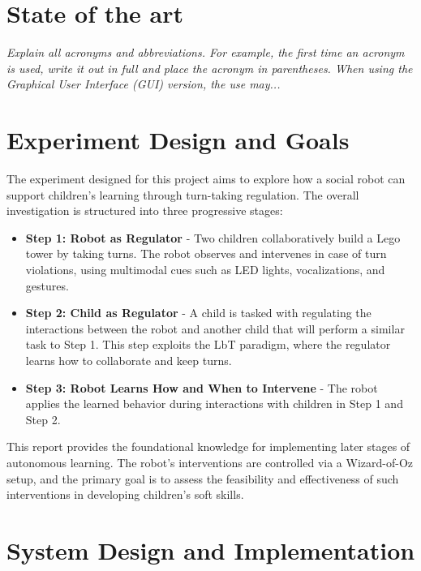 \documentclass[a4paper]{usiinfbachelorproject}
\begin{document}
\section{\textbf{State of the art}}\label{sec:background}
\textit{
    Explain all acronyms and abbreviations. For example, the first time an acronym is used, write it out in full and place the acronym in
    parentheses. When using the Graphical User Interface (GUI) version, the use may...
}


\section{\textbf{Experiment Design and Goals}}\label{sec:design}

The experiment designed for this project aims to explore how a social robot can support children's learning through turn-taking regulation. The overall investigation is structured into three progressive stages:

\begin{itemize}
    \item \textbf{Step 1: Robot as Regulator} - Two children collaboratively build a Lego tower by taking turns. The robot observes and intervenes in case of turn violations, using multimodal cues such as LED lights, vocalizations, and gestures.
    \item \textbf{Step 2: Child as Regulator} - A child is tasked with regulating the interactions between the robot and another child that will perform a similar task to Step 1. This step exploits the LbT paradigm, where the regulator learns how to collaborate and keep turns.
    \item \textbf{Step 3: Robot Learns How and When to Intervene} - The robot applies the learned behavior during interactions with children in Step 1 and Step 2.
\end{itemize}

This report provides the foundational knowledge for implementing later stages of autonomous learning. The robot's interventions are controlled via a Wizard-of-Oz setup, and the primary goal is to assess the feasibility and effectiveness of such interventions in developing children's soft skills.


\section{\textbf{System Design and Implementation}}\label{sec:system}
\end{document}
